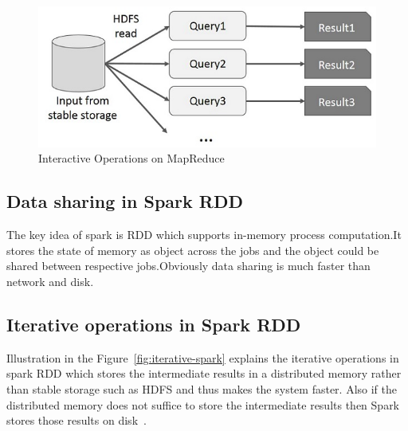 \begin{figure}[!ht]
  \centering\includegraphics[width=\columnwidth]{images/interactive-MapReduce.png}
   \caption{Interactive Operations on MapReduce
   ~\cite{hid-sp18-410-spark-RDD}}\label{fig:interactive-MapRed}
\end{figure}




\subsection{Data sharing in Spark RDD}
The key idea of spark is RDD which supports in-memory process computation.It 
stores the state of memory as object across the jobs and the object could be 
shared between respective jobs.Obviously data sharing is much faster than 
network and disk.


\subsection{Iterative operations in Spark RDD}

Illustration in the Figure~\ref{fig:iterative-spark} explains the iterative 
operations in spark RDD which stores the intermediate results in a distributed 
memory rather than stable storage such as HDFS and thus makes the system faster.
Also if the distributed memory does not suffice to store the intermediate 
results then Spark stores those results on disk~\cite{hid-sp18-410-spark-RDD}.




